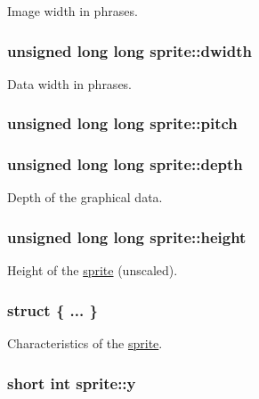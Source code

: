 Image width in phrases. \hypertarget{structsprite_a487d38c3308266aa5c45f8604b0113c}{
\subsubsection{\setlength{\rightskip}{0pt plus 5cm}unsigned long long {\bf sprite::dwidth}}}
\label{structsprite_a487d38c3308266aa5c45f8604b0113c}


Data width in phrases. \hypertarget{structsprite_3510411d9f6637c3a164f277801c98bd}{
\subsubsection{\setlength{\rightskip}{0pt plus 5cm}unsigned long long {\bf sprite::pitch}}}
\label{structsprite_3510411d9f6637c3a164f277801c98bd}


\hypertarget{structsprite_95000d86cccbadcd1222da63b9a0aa75}{
\subsubsection{\setlength{\rightskip}{0pt plus 5cm}unsigned long long {\bf sprite::depth}}}
\label{structsprite_95000d86cccbadcd1222da63b9a0aa75}


Depth of the graphical data. \hypertarget{structsprite_8c4e729d80e000f3ffe6896bde16ec56}{
\subsubsection{\setlength{\rightskip}{0pt plus 5cm}unsigned long long {\bf sprite::height}}}
\label{structsprite_8c4e729d80e000f3ffe6896bde16ec56}


Height of the \hyperlink{structsprite}{sprite} (unscaled). \hypertarget{structsprite_7b5e6e72419124345aad024c12284796}{
\subsubsection{\setlength{\rightskip}{0pt plus 5cm}struct \{ ... \} }}
\label{structsprite_7b5e6e72419124345aad024c12284796}


Characteristics of the \hyperlink{structsprite}{sprite}. \hypertarget{structsprite_a8dc6f3d689443af5ec63fd4d90ed519}{
\subsubsection{\setlength{\rightskip}{0pt plus 5cm}short int {\bf sprite::y}}}
\label{structsprite_a8dc6f3d689443af5ec63fd4d90ed519}



